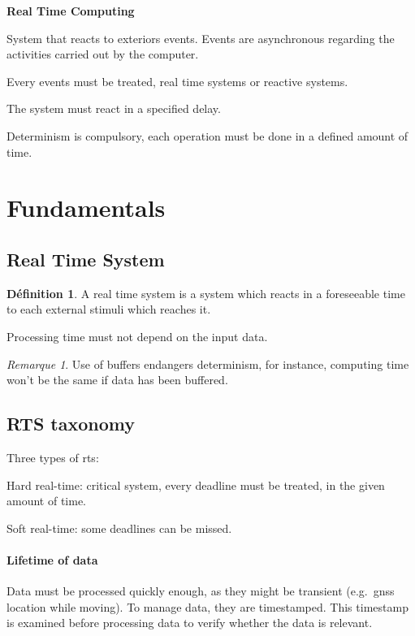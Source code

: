 \documentclass[10pt]{article}
\theoremstyle{plain}
\theoremstyle{definition}
\newtheorem{defn}{Définition}
\theoremstyle{remark}
\newtheorem{rem}{Remarque}
\begin{document}
\begin{center}
	\Large\textbf{Real Time Computing}
\end{center}
\begin{compactitem}
	\item System that reacts to exteriors events. Events are
		asynchronous regarding the activities carried out by the computer.
	\item Every events must be treated, real time systems or reactive systems.
	\item The system must react in a specified delay.
	\item Determinism is compulsory, each operation must be done in a defined
		amount of time.
\end{compactitem}

\section{Fundamentals}
\subsection{Real Time System}
\begin{defn}
	A real time system is a system which reacts in a foreseeable time to each
	external stimuli which reaches it.

	Processing time must not depend on the input data.
\end{defn}
\begin{rem}
	Use of buffers endangers determinism, for instance, computing time won't be
	the same if data has been buffered.
\end{rem}

\subsection{RTS taxonomy}
Three types of rts:
\begin{compactitem}
	\item Hard real-time: critical system, every deadline must be treated, in 
		the given amount of time.
	\item Soft real-time: some deadlines can be missed.
\end{compactitem}

\paragraph{Lifetime of data}
Data must be processed quickly enough, as they might be transient (e.g.\ gnss
location while moving). To manage data, they are timestamped. This timestamp is
examined before processing data to verify whether the data is relevant.
\end{document}
